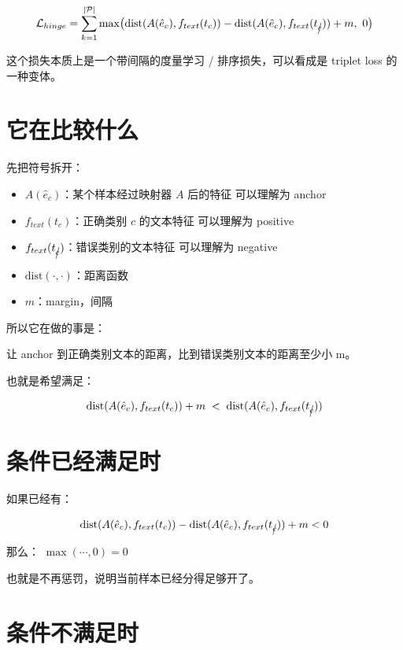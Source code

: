 \[
\mathcal{L}_{hinge} = \sum_{k=1}^{|\mathcal{P}|} \max\bigl(\text{dist}(A(\hat{e}_c), f_{text}(t_c)) - \text{dist}(A(\hat{e}_c), f_{text}(t_{\cancel{c}})) + m,\ 0\bigr)
\]

这个损失本质上是一个带间隔的度量学习 / 排序损失，可以看成是 triplet loss 的一种变体。

\section{它在比较什么}

先把符号拆开：

\begin{itemize}
  \item \(A(\hat{e}_c)\)：某个样本经过映射器 \(A\) 后的特征
  可以理解为 anchor
  \item \(f_{text}(t_c)\)：正确类别 \(c\) 的文本特征
  可以理解为 positive
  \item \(f_{text}(t_{\cancel{c}})\)：错误类别的文本特征
  可以理解为 negative
  \item \(\text{dist}(\cdot,\cdot)\)：距离函数
  \item \(m\)：margin，间隔
\end{itemize}

所以它在做的事是：

让 anchor 到正确类别文本的距离，比到错误类别文本的距离至少小 m。

也就是希望满足：

\[
\text{dist}(A(\hat{e}_c), f_{text}(t_c)) + m
\;<\;
\text{dist}(A(\hat{e}_c), f_{text}(t_{\cancel{c}}))
\]

\section{条件已经满足时}

如果已经有：

\[
\text{dist}(A(\hat{e}_c), f_{text}(t_c)) - \text{dist}(A(\hat{e}_c), f_{text}(t_{\cancel{c}})) + m < 0
\]

那么： \( \max(\cdots,0)=0\)

也就是不再惩罚，说明当前样本已经分得足够开了。

\section{条件不满足时}

